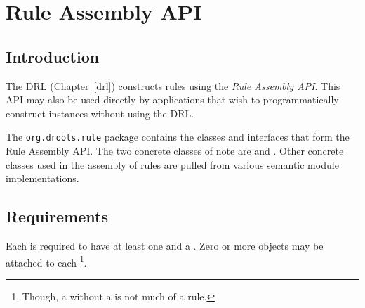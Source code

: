 \chapter{Rule Assembly API}
\label{rule.assembly}

\section{Introduction}

The DRL (Chapter~\vref{drl}) constructs rules using the
\emph{Rule Assembly API}.  This API may also be used
directly by applications that wish to programmatically construct
 instances without using the DRL.

The \texttt{org.drools.rule} package contains the classes
and interfaces that form the Rule Assembly API.  The two concrete
classes of note are  and .
Other concrete classes used in the assembly of rules are
pulled from various semantic module implementations.

\section{Requirements}

Each  is required to have at least one
 and a .
Zero or more  objects may be attached
to each \footnote{Though, a  without a
 is not much of a rule.}.
